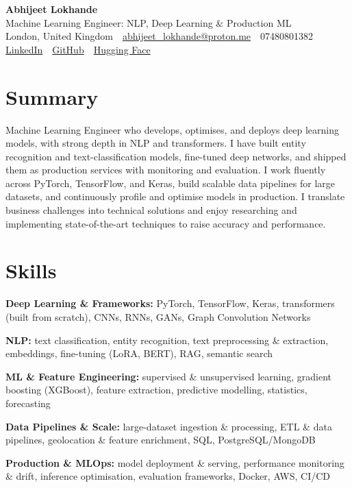 \documentclass[10pt,a4paper]{article}
\newcommand{\sep}{\,\textcolor{accent!60}{\textbar}\,}
\begin{document}
\begin{center}
  {\fontsize{24}{26}\selectfont\bfseries Abhijeet Lokhande}\\[3pt]
  {\color{accent}\large Machine Learning Engineer: NLP, Deep Learning \& Production ML}\\[5pt]
  {\small
    London, United Kingdom \sep
    \href{mailto:abhijeet_lokhande@proton.me}{abhijeet\_lokhande@proton.me} \sep
    07480801382 \\[2pt]
    \href{https://www.linkedin.com/in/ablds/}{LinkedIn} \sep
    \href{https://github.com/abhijeetscode}{GitHub} \sep
    \href{https://huggingface.co/ab-ai}{Hugging Face}
  }
\end{center}
\vspace{2pt}

\section{Summary}
Machine Learning Engineer who develops, optimises, and deploys deep learning models, with strong depth in NLP and transformers. I have built entity recognition and text-classification models, fine-tuned deep networks, and shipped them as production services with monitoring and evaluation. I work fluently across PyTorch, TensorFlow, and Keras, build scalable data pipelines for large datasets, and continuously profile and optimise models in production. I translate business challenges into technical solutions and enjoy researching and implementing state-of-the-art techniques to raise accuracy and performance.

\section{Skills}
\begin{tight}
  \item[\textcolor{accent}{\small$\bullet$}] \textbf{Deep Learning \& Frameworks:} PyTorch, TensorFlow, Keras, transformers (built from scratch), CNNs, RNNs, GANs, Graph Convolution Networks
  \item[\textcolor{accent}{\small$\bullet$}] \textbf{NLP:} text classification, entity recognition, text preprocessing \& extraction, embeddings, fine-tuning (LoRA, BERT), RAG, semantic search
  \item[\textcolor{accent}{\small$\bullet$}] \textbf{ML \& Feature Engineering:} supervised \& unsupervised learning, gradient boosting (XGBoost), feature extraction, predictive modelling, statistics, forecasting
  \item[\textcolor{accent}{\small$\bullet$}] \textbf{Data Pipelines \& Scale:} large-dataset ingestion \& processing, ETL \& data pipelines, geolocation \& feature enrichment, SQL, PostgreSQL/MongoDB
  \item[\textcolor{accent}{\small$\bullet$}] \textbf{Production \& MLOps:} model deployment \& serving, performance monitoring \& drift, inference optimisation, evaluation frameworks, Docker, AWS, CI/CD
\end{tight}
\end{document}
